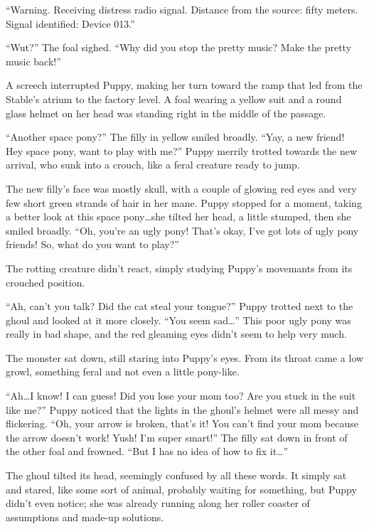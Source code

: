 ``{\mt Warning. Receiving distress radio signal. Distance from the source: fifty meters. Signal identified: Device 013.}''

``Wut?'' The foal sighed. ``Why did you stop the pretty music? Make the pretty music back!''

A screech interrupted Puppy, making her turn toward the ramp that led from the Stable's atrium to the factory level. A foal wearing a yellow suit and a round glass helmet on her head was standing right in the middle of the passage.

``Another space pony?'' The filly in yellow smiled broadly. ``Yay, a new friend! Hey space pony, want to play with me?'' Puppy merrily trotted towards the new arrival, who sunk into a crouch, like a feral creature ready to jump.

The new filly's face was mostly skull, with a couple of glowing red eyes and very few short green strands of hair in her mane. Puppy stopped for a moment, taking a better look at this space pony\dots she tilted her head, a little stumped, then she smiled broadly. ``Oh, you're an ugly pony! That's okay, I've got lots of ugly pony friends! So, what do you want to play?''

The rotting creature didn't react, simply studying Puppy's movemants from its crouched position.

``Ah, can't you talk? Did the cat steal your tongue?'' Puppy trotted next to the ghoul and looked at it more closely. ``You seem sad\dots'' This poor ugly pony was really in bad shape, and the red gleaming eyes didn't seem to help very much.

The monster sat down, still staring into Puppy's eyes. From its throat came a low growl, something feral and not even a little pony-like.

``Ah\dots I know! I can guess! Did you lose your mom too? Are you stuck in the suit like me?'' Puppy noticed that the lights in the ghoul's helmet were all messy and flickering. ``Oh, your arrow is broken, that's it! You can't find your mom because the arrow doesn't work! Yush! I'm super smart!'' The filly sat down in front of the other foal and frowned. ``But I has no idea of how to fix it\dots''

The ghoul tilted its head, seemingly confused by all these words. It simply sat and stared, like some sort of animal, probably waiting for something, but Puppy didn't even notice; she was already running along her roller coaster of assumptions and made-up solutions.

